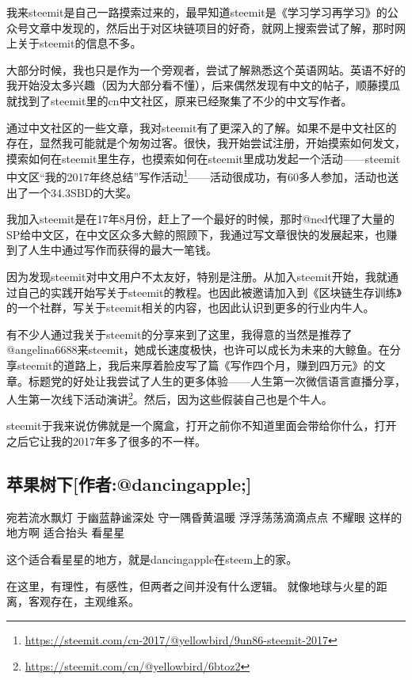 \documentclass[]{ctexbook}
\renewcommand{\href}[2]{#2\footnote{\url{#1}}}
\begin{document}
我来steemit是自己一路摸索过来的，最早知道steemit是《学习学习再学习》的公众号文章中发现的，然后出于对区块链项目的好奇，就网上搜索尝试了解，那时网上关于steemit的信息不多。

大部分时候，我也只是作为一个旁观者，尝试了解熟悉这个英语网站。英语不好的我开始没太多兴趣（因为大部分看不懂），后来偶然发现有中文的帖子，顺藤摸瓜就找到了steemit里的cn中文社区，原来已经聚集了不少的中文写作者。

通过中文社区的一些文章，我对steemit有了更深入的了解。如果不是中文社区的存在，显然我可能就是个匆匆过客。很快，我开始尝试注册，开始摸索如何发文，摸索如何在steemit里生存，也摸索如何在steemit里成功发起一个活动------\href{https://steemit.com/cn-2017/@yellowbird/9un86-steemit-2017}{steemit中文区``我的2017年终总结''写作活动}------活动很成功，有60多人参加，活动也送出了一个34.3SBD的大奖。

我加入steemit是在17年8月份，赶上了一个最好的时候，那时@ned代理了大量的SP给中文区，在中文区众多大鲸的照顾下，我通过写文章很快的发展起来，也赚到了人生中通过写作而获得的最大一笔钱。

因为发现steemit对中文用户不太友好，特别是注册。从加入steemit开始，我就通过自己的实践开始写关于steemit的教程。也因此被邀请加入到《区块链生存训练》的一个社群，写关于steemit相关的内容，也因此认识到更多的行业内牛人。

有不少人通过我关于steemit的分享来到了这里，我得意的当然是推荐了@angelina6688来steemit，她成长速度极快，也许可以成长为未来的大鲸鱼。在分享steemit的道路上，我后来厚着脸皮写了篇《写作四个月，赚到四万元》的文章。标题党的好处让我尝试了人生的更多体验------\href{https://steemit.com/cn/@yellowbird/6btoz2}{人生第一次微信语言直播分享，人生第一次线下活动演讲}。然后，因为这些假装自己也是个牛人。

steemit于我来说仿佛就是一个魔盒，打开之前你不知道里面会带给你什么，打开之后它让我的2017年多了很多的不一样。

\hypertarget{dancingapple}{%
\subsection{苹果树下{[}作者:@dancingapple;{]}}\label{dancingapple}}

宛若流水飘灯
于幽蓝静谧深处
守一隅昏黄温暖
浮浮荡荡滴滴点点
不耀眼
这样的地方啊
适合抬头
看星星

这个适合看星星的地方，就是dancingapple在steem上的家。

在这里，有理性，有感性，但两者之间并没有什么逻辑。
就像地球与火星的距离，客观存在，主观维系。
\end{document}
